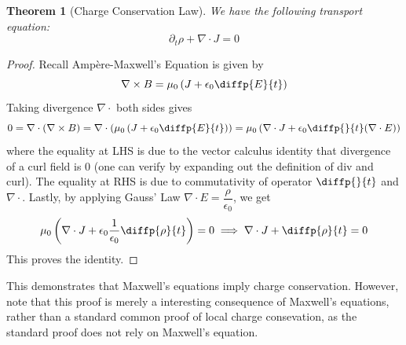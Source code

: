 \documentclass{article}
\newtheorem{thm}{Theorem}
\theoremstyle{definition}
\newcommand{\br}[1]{\left(#1\right)}
\begin{document}
\begin{thm} [Charge Conservation Law]
    We have the following transport equation:
    \[\partial_t \rho + \nabla\cdot J = 0\]
\end{thm}
\begin{proof}
    Recall Ampère-Maxwell's Equation is given by
    \[\nabla \times B = \mu_0 \br{J + \epsilon_0 \diffp{E}{t}}\]
    Taking divergence $\nabla\cdot$ both sides gives
    \[0 = \nabla\cdot (\nabla\times B) = \nabla\cdot \br{\mu_0 \br{J + \epsilon_0 \diffp{E}{t}}} = \mu_0 \br{\nabla\cdot J + \epsilon_0 \diffp{}{t} (\nabla\cdot E)}\]
    where the equality at LHS is due to the vector calculus identity that divergence of a curl field is $0$ (one can verify by expanding out the definition of div and curl). The equality at RHS is due to commutativity of operator $\diffp{}{t}$ and $\nabla\cdot$. Lastly, by applying Gauss' Law $\nabla\cdot E = \dfrac{\rho}{\epsilon_0}$, we get 
    \[\mu_0\br{\nabla\cdot J + \epsilon_0 \frac{1}{\epsilon_0}\diffp{\rho}{t}} = 0 \implies \nabla\cdot J + \diffp{\rho}{t} =0\]
    This proves the identity.
\end{proof}

This demonstrates that Maxwell's equations imply charge conservation. However, note that this proof is merely a interesting consequence of Maxwell's equations, rather than a standard common proof of local charge consevation, as the standard proof does not rely on Maxwell's equation.
\end{document}
